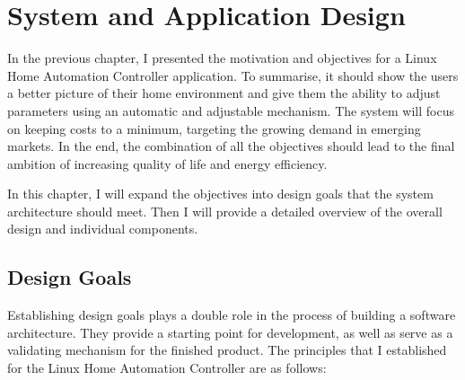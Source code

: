 \chapter{System and Application Design}

In the previous chapter, I presented the motivation and objectives for a Linux Home Automation Controller application. To summarise, it should show the users a better picture of their home environment and give them the ability to adjust parameters using an automatic and adjustable mechanism. The system will focus on keeping costs to a minimum, targeting the growing demand in emerging markets. In the end, the combination of all the objectives should lead to the final ambition of increasing quality of life and energy efficiency. 

In this chapter, I will expand the objectives into design goals that the system architecture should meet. Then I will provide a detailed overview of the overall design and individual components.

\section{Design Goals}
\label{sec:design-goals}

Establishing design goals plays a double role in the process of building a software architecture. They provide a starting point for development, as well as serve as a validating mechanism for the finished product. The principles that I established for the Linux Home Automation Controller are as follows:

